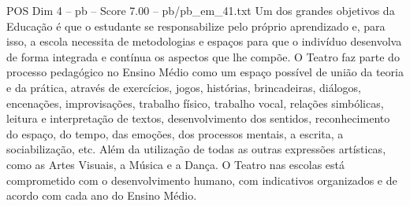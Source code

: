 \begin{textsample}{POS Dim 4 – pb – Score 7.00 – pb/pb\_em\_41.txt}
Um dos grandes objetivos da Educação é que o estudante se responsabilize pelo próprio aprendizado e, para isso, a escola necessita de metodologias e espaços para que o indivíduo desenvolva de forma integrada e contínua os aspectos que lhe compõe.
O Teatro faz parte do processo pedagógico no Ensino Médio como um espaço possível de união da teoria e da prática, através de exercícios, jogos, histórias, brincadeiras, diálogos, encenações, improvisações, trabalho físico, trabalho vocal, relações simbólicas, leitura e interpretação de textos, desenvolvimento dos sentidos, reconhecimento do espaço, do tempo, das emoções, dos processos mentais, a escrita, a sociabilização, etc.
Além da utilização de todas as outras expressões artísticas, como as Artes Visuais, a Música e a Dança.
O Teatro nas escolas está comprometido com o desenvolvimento humano, com indicativos organizados e de acordo com cada ano do Ensino Médio.

\end{textsample}
